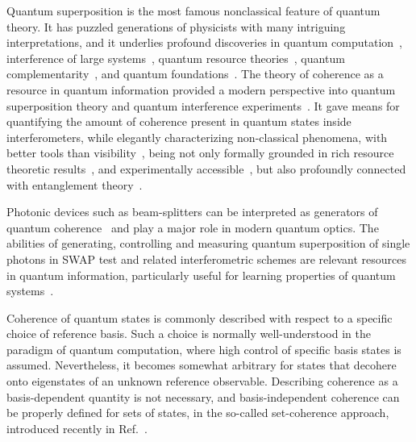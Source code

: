 \documentclass[a4paper,twocolumn,11pt,accepted=2024-01-17]{quantumarticle}
\begin{document}
Quantum superposition is the most famous nonclassical feature of quantum theory. It has puzzled generations of physicists with many intriguing interpretations, and it underlies profound discoveries in quantum computation~\cite{shor1999polynomial,parker2000efficient,ahnefeld2022role}, interference of large systems~\cite{nairz2003quantum}, quantum resource theories~\cite{Chitambar19}, quantum complementarity~\cite{bohr1928quantum,wootters1979complementarity,englert1996fringe,cheng2015complementarity,basso2021complete}, and quantum foundations~\cite{elitzur1993quantum,hardy1992existence}. The theory of coherence as a resource in quantum information provided a modern perspective into quantum superposition theory and quantum interference experiments~\cite{baumgratz2014quantifying,Streltsov17}. It gave means for quantifying the amount of coherence present in quantum states inside interferometers, while elegantly characterizing non-classical phenomena{, with better tools} than visibility~\cite{chrysosthemos_quantum_2022,mishra2019decoherence,qureshi2019coherence}, being not only formally grounded in rich resource theoretic results~\cite{biswas_interferometric_2017,paul2017measuring},  and experimentally accessible~\cite{wu2021experimental}, but also profoundly connected with entanglement theory~\cite{streltsov2015measuring,streltsov2016entanglement,qiao2018entanglement}. 

Photonic devices such as beam-splitters can be interpreted as generators of quantum coherence~\cite{masini2021coherence,ares2022beam} and play a major role in modern quantum optics. The abilities of generating, controlling and measuring quantum superposition of single photons in SWAP test and related interferometric schemes are relevant resources in quantum information, particularly useful for learning properties of quantum systems~\cite{ekert2002direct,horodecki2002method,oszmaniec2021measuring}. 

Coherence of quantum states is commonly described with respect to a specific choice of reference basis. Such a choice is normally well-understood in the paradigm of quantum computation, where high control of specific basis states is assumed. Nevertheless, it becomes somewhat arbitrary for states that decohere onto eigenstates of an unknown reference observable. Describing coherence as a basis-dependent quantity is not necessary, and basis-independent coherence can be properly defined for sets of states, in the so-called set-coherence approach{, introduced recently in Ref.}~\cite{designolle2021set}. 
\end{document}
